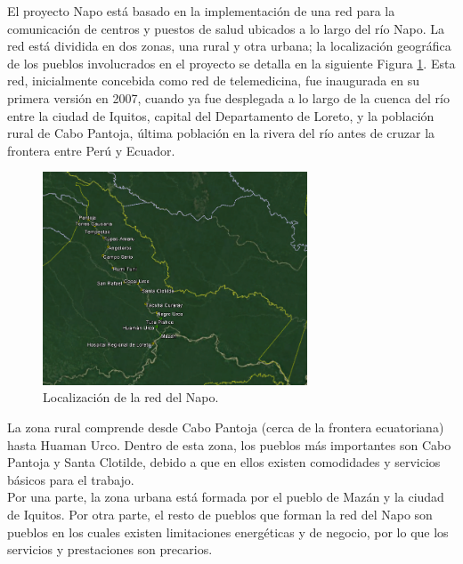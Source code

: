 	El proyecto Napo está basado en la implementación de una red para la comunicación de centros y puestos de salud ubicados a lo largo del río Napo. La red está dividida en dos zonas, una rural y otra urbana; la localización geográfica de los pueblos involucrados en el proyecto se detalla en la siguiente Figura \ref{NetNapo}. Esta red, inicialmente concebida como red de telemedicina, fue inaugurada en su primera versión en 2007, cuando ya fue desplegada a lo largo de la cuenca del río entre la ciudad de Iquitos, capital del Departamento de Loreto, y la población rural de Cabo Pantoja, última población en la rivera del río antes de cruzar la frontera entre Perú y Ecuador. 
	\begin{figure}[H]
		\centering
		\includegraphics[width=0.7\textwidth]{img/network.png}
		\caption{Localización de la red del Napo.}
		\label{NetNapo}
	\end{figure}
	La zona rural comprende desde Cabo Pantoja (cerca de la frontera ecuatoriana) hasta Huaman Urco. Dentro de esta zona, los pueblos más importantes son Cabo Pantoja y Santa Clotilde, debido a que en ellos existen comodidades y servicios básicos para el trabajo.\\
	Por una parte, la zona urbana está formada por el pueblo de Mazán y la ciudad de Iquitos. Por otra parte, el resto de pueblos que forman la red del Napo son pueblos en los cuales existen limitaciones energéticas y de negocio, por lo que los servicios y prestaciones son precarios.\\\\
	 
